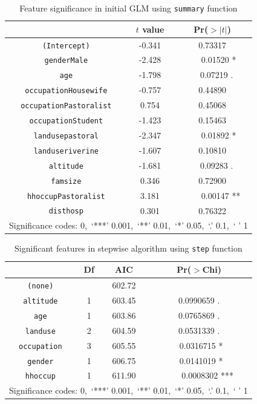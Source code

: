 \documentclass[11pt,twoside]{article}
\numberwithin{Theorem}{section}
\numberwithin{Definition}{section}
\numberwithin{Lemma}{section}
\numberwithin{Algorithm}{section}
\numberwithin{equation}{section}
\begin{document}
\begin{table}[!h]
	\centering
	\begin{tabular}{|c|c|c|}
		\hline
		 & $t$ value & Pr($>|t|$) \\
		\hline
		\texttt{(Intercept)} & -0.341 & 0.73317 \\
		\texttt{genderMale} & -2.428 & \ \ \ 0.01520 * \\
		\texttt{age} & -1.798 & \ \ 0.07219 . \\
		\texttt{occupationHousewife} & -0.757 & 0.44890 \\  
		\texttt{occupationPastoralist} & 0.754 & 0.45068 \\   
		\texttt{occupationStudent} & -1.423 & 0.15463 \\  
		\texttt{landusepastoral} & -2.347 & \ \ \ 0.01892 * \\ 
		\texttt{landuseriverine} & -1.607 & 0.10810 \\   
		\texttt{altitude} & -1.681 & \ \ 0.09283 . \\
		\texttt{famsize} & 0.346 & 0.72900 \\   
		\texttt{hhoccupPastoralist} & 3.181 & \ \ \ \ 0.00147 ** \\
		\texttt{disthosp} & 0.301 & 0.76322 \\   
		\hline
		\multicolumn{3}{|l|}{Significance codes: 0,\ ‘***’ 0.001,\ ‘**’ 0.01,\ ‘*’ 0.05,\ ‘.’ 0.1,\ ‘ ’ 1} \\
		\hline
	\end{tabular}
	\caption{Feature significance in initial GLM using \texttt{summary} function}
	\label{tab:summary1}
\end{table}

\begin{table}[!h]
	\centering
	\begin{tabular}{|c|c|c|c|}
		\hline
		 & Df & AIC & Pr($>$Chi) \\
		\hline
		\texttt{(none)} & & 602.72 & \\                      
		\texttt{altitude} & 1 & 603.45 & 0.0990659 . \\ 
		\texttt{age} & 1 & 603.86 & 0.0765869 . \\ 
		\texttt{landuse} & 2 & 604.59 & 0.0531339 . \\ 
		\texttt{occupation} & 3 & 605.55 & \ 0.0316715 * \\ 
		\texttt{gender} & 1 & 606.75 & \ 0.0141019 * \\ 
		\texttt{hhoccup} & 1 & 611.90 & \ \ \ \ 0.0008302 *** \\
		\hline
		\multicolumn{4}{|l|}{Significance codes: 0,\ ‘***’ 0.001,\ ‘**’ 0.01,\ ‘*’ 0.05,\ ‘.’ 0.1,\ ‘ ’ 1} \\
		\hline
	\end{tabular}
	\caption{Significant features in stepwise algorithm using \texttt{step} function}
	\label{tab:step1}
\end{table}
\end{document}

